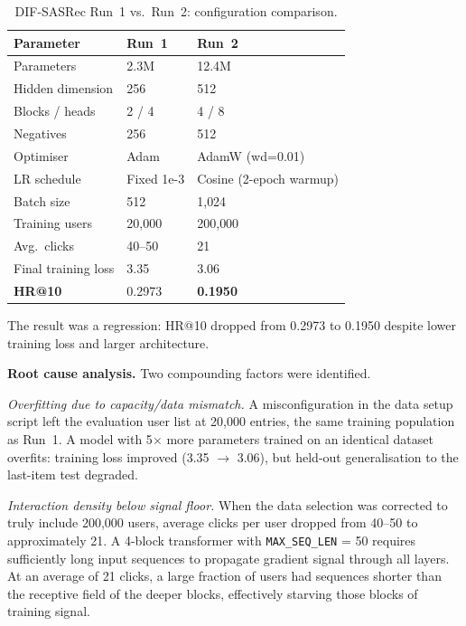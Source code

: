 \begin{table}[H]
\centering
\caption{DIF-SASRec Run~1 vs.\ Run~2: configuration comparison.}
\label{tab:train_run2}
\begin{tabular}{lll}
\hline
\textbf{Parameter}   & \textbf{Run~1} & \textbf{Run~2} \\
\hline
Parameters           & 2.3M           & 12.4M \\
Hidden dimension     & 256            & 512 \\
Blocks / heads       & 2 / 4          & 4 / 8 \\
Negatives            & 256            & 512 \\
Optimiser            & Adam           & AdamW (wd=0.01) \\
LR schedule          & Fixed 1e-3     & Cosine (2-epoch warmup) \\
Batch size           & 512            & 1{,}024 \\
Training users       & 20{,}000       & 200{,}000 \\
Avg.\ clicks         & 40--50         & 21 \\
Final training loss  & 3.35           & 3.06 \\
\hline
\textbf{HR@10}       & 0.2973         & \textbf{0.1950} \\
\hline
\end{tabular}
\end{table}

The result was a regression: HR@10 dropped from 0.2973 to 0.1950 despite lower training loss and larger architecture.

\textbf{Root cause analysis.}
Two compounding factors were identified.

\emph{Overfitting due to capacity/data mismatch.}
A misconfiguration in the data setup script left the evaluation user list at 20{,}000 entries, the same training population as Run~1.
A model with 5$\times$ more parameters trained on an identical dataset overfits: training loss improved (3.35 $\to$ 3.06), but held-out generalisation to the last-item test degraded.

\emph{Interaction density below signal floor.}
When the data selection was corrected to truly include 200{,}000 users, average clicks per user dropped from 40--50 to approximately 21.
A 4-block transformer with \texttt{MAX\_SEQ\_LEN} = 50 requires sufficiently long input sequences to propagate gradient signal through all layers.
At an average of 21 clicks, a large fraction of users had sequences shorter than the receptive field of the deeper blocks, effectively starving those blocks of training signal.

